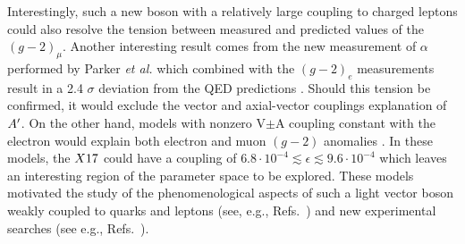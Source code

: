 Interestingly, such a new boson with a relatively large coupling to charged leptons could also resolve the tension between measured and predicted values of the $(g - 2)_{\mu}$. Another interesting result comes from the new measurement of $\alpha$ performed by Parker \textit{et al.} \cite{Parker191} which combined with the $(g-2)_e$ measurements result in a 2.4 $\sigma$ deviation from the QED predictions \cite{PhysRevLett.100.120801}. Should this tension be confirmed, it would exclude the vector and axial-vector couplings explanation of $A'$. On the other hand, models with nonzero V$\pm$A coupling constant with the electron would explain both electron and muon $(g - 2)$ anomalies \cite{Krasnikov:2019dgh}. In these models, the $X17$ could have a coupling of $6.8\cdot 10^{-4} \lesssim \epsilon \lesssim 9.6 \cdot 10^{-4}$ which leaves an interesting region of the parameter space to be explored. These models motivated the study of the phenomenological aspects of such a light vector boson weakly coupled to quarks and leptons (see, e.g., Refs.~\cite{fayet1, fayet2, fayet3, fayet4,jk, cheng, Zhang:2017zap, ia, liang, bart}) and new experimental searches (see e.g., Refs.~\cite{battaglieri2017cosmic, nardi}).

